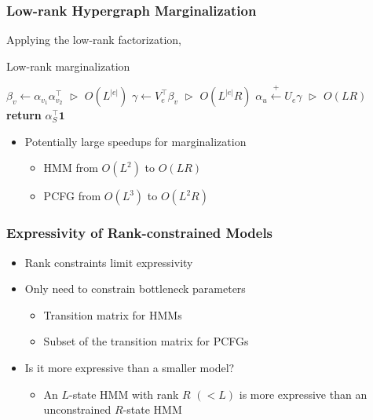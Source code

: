 \documentclass{beamer}
\begin{document}
\begin{frame}
\frametitle{Low-rank Hypergraph Marginalization}

Applying the low-rank factorization,

\begin{center}
\begin{algorithm}[H]
\caption{\label{alg:low-rank-update} Low-rank marginalization}
\begin{algorithmic} 
\STATE $\beta_v \gets \alpha_{v_1}\alpha_{v_2}^\top$
    \hfill $\vartriangleright$ $O(L^{|e|})$
\STATE $\gamma \gets V_e^\top\beta_v$
    \hfill $\vartriangleright$ $O(L^{|e|}R)$
\STATE $\alpha_u \stackrel{+}{\gets} U_e\gamma $
    \hfill $\vartriangleright$ $O(LR)$
\ENDFOR
\STATE \textbf{return} $\alpha_S^\top\mathbf{1}$
\end{algorithmic} 
\end{algorithm}
\end{center}

\begin{itemize}
\item Potentially large speedups for marginalization
    \begin{itemize}
    \item HMM from $O(L^2)$ to $O(LR)$
    \item PCFG from $O(L^3)$ to $O(L^2R)$
    \end{itemize}
\end{itemize}


\end{frame}

\begin{frame}
\frametitle{Expressivity of Rank-constrained Models}
\begin{itemize}
\item Rank constraints limit expressivity
\vspace{1em}
\item Only need to constrain bottleneck parameters
    \begin{itemize}
    \item Transition matrix for HMMs
    \item Subset of the transition matrix for PCFGs
    \end{itemize}
\vspace{1em}
\item Is it more expressive than a smaller model?
    \begin{itemize}
    \item An $L$-state HMM with rank $R$ $(< L)$ is more
        expressive than an unconstrained $R$-state HMM
    \end{itemize}
\end{itemize}
\end{frame}
\end{document}

